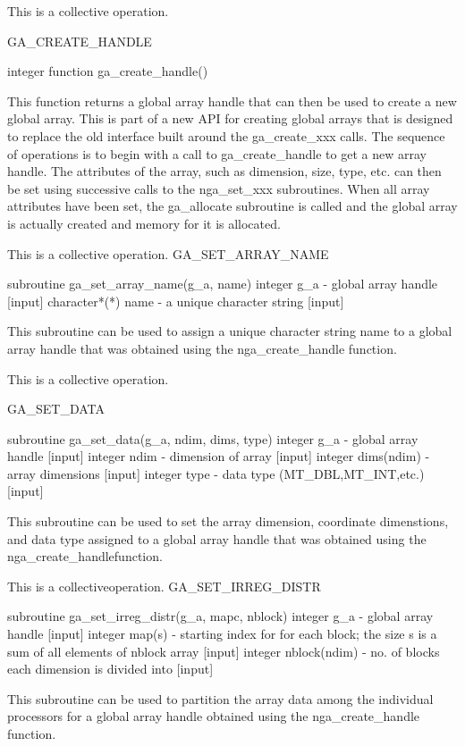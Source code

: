 This is a collective operation.

GA\_CREATE\_HANDLE

integer function ga\_create\_handle()

This function returns a global array handle that can then be used
to create a new global array. This is part of a new API for creating
global arrays that is designed to replace the old interface built
around the ga\_create\_xxx calls. The sequence of operations is to
begin with a call to ga\_create\_handle to get a new array handle.
The attributes of the array, such as dimension, size, type, etc. can
then be set using successive calls to the nga\_set\_xxx subroutines.
When all array attributes have been set, the ga\_allocate subroutine
is called and the global array is actually created and memory for
it is allocated.

This is a collective operation. GA\_SET\_ARRAY\_NAME

subroutine ga\_set\_array\_name(g\_a, name) integer g\_a - global
array handle {[}input{]} character{*}({*}) name - a unique character
string {[}input{]}

This subroutine can be used to assign a unique character string name
to a global array handle that was obtained using the nga\_create\_handle
function.

This is a collective operation.

GA\_SET\_DATA

subroutine ga\_set\_data(g\_a, ndim, dims, type) integer g\_a - global
array handle {[}input{]} integer ndim - dimension of array {[}input{]}
integer dims(ndim) - array dimensions {[}input{]} integer type - data
type (MT\_DBL,MT\_INT,etc.) {[}input{]}

This subroutine can be used to set the array dimension, coordinate
dimenstions, and data type assigned to a global array handle that
was obtained using the nga\_create\_handlefunction.

This is a collectiveoperation. GA\_SET\_IRREG\_DISTR

subroutine ga\_set\_irreg\_distr(g\_a, mapc, nblock) integer g\_a
- global array handle {[}input{]} integer map(s) - starting index
for for each block; the size s is a sum of all elements of nblock
array {[}input{]} integer nblock(ndim) - no. of blocks each dimension
is divided into {[}input{]}

This subroutine can be used to partition the array data among the
individual processors for a global array handle obtained using the
nga\_create\_handle function.

